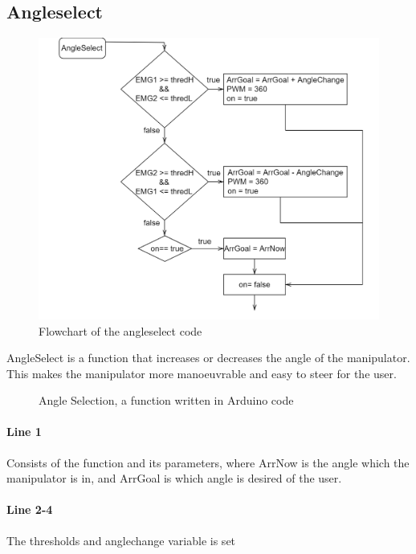 \subsection*{Angleselect}
\begin{figure}[H]
    \centering
    \includegraphics[width=\textwidth]{Figures/Technical_figures/angleselect.png}
    \caption{Flowchart of the angleselect code }
    \label{fig:angleSel}
\end{figure}
AngleSelect is a function that increases or decreases the angle of the manipulator. This makes the manipulator more manoeuvrable and easy to steer for the user.\\
\begin{figure}[H]
    \centering

    \caption{Angle Selection, a function written in Arduino code}
    \label{fig:AngleSel}
\end{figure}
\paragraph{Line 1} Consists of the function and its parameters, where ArrNow is the angle which the manipulator is in, and ArrGoal is which angle is desired of the user.\\
\paragraph{Line 2-4} The thresholds and anglechange variable is set\\
